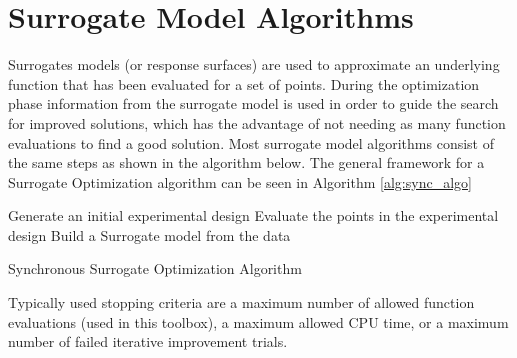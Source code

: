 \documentclass[]{article}
\begin{document}
\section{Surrogate Model Algorithms}
Surrogates models (or response surfaces) are used to approximate an underlying function that has been evaluated for a set of points. During the optimization phase information from the surrogate model is used in order to guide the search for improved solutions, which has the advantage of not needing as many function evaluations to find a good solution. Most surrogate model algorithms consist of the same steps as shown in the algorithm below.
The general framework for a Surrogate Optimization algorithm can be seen in Algorithm \ref{alg:sync_algo}

\begin{algorithm}[!h]
\LinesNumbered
{}


Generate an initial experimental design\;{\label{restart}}
Evaluate the points in the experimental design\;
Build a Surrogate model from the data\;
\caption{Synchronous Surrogate Optimization Algorithm}
\label{alg:sync_algo}
\end{algorithm} 

\noindent Typically used stopping criteria are a maximum number of allowed function evaluations (used in this toolbox), a maximum allowed CPU time, or a maximum number of failed iterative improvement trials.
\end{document}
